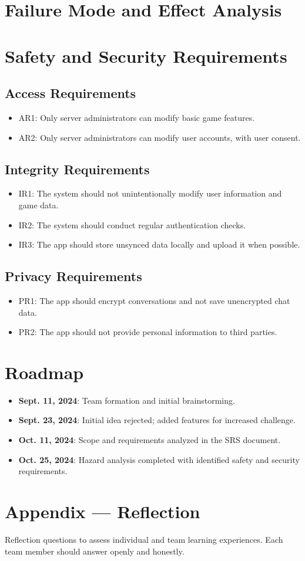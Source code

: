 \documentclass{article}
\begin{document}
\section{Failure Mode and Effect Analysis}

\section{Safety and Security Requirements}
\subsection{Access Requirements}
\begin{itemize}
    \item AR1: Only server administrators can modify basic game features.
    \item AR2: Only server administrators can modify user accounts, with user consent.
\end{itemize}

\subsection{Integrity Requirements}
\begin{itemize}
    \item IR1: The system should not unintentionally modify user information and game data.
    \item IR2: The system should conduct regular authentication checks.
    \item IR3: The app should store unsynced data locally and upload it when possible.
\end{itemize}

\subsection{Privacy Requirements}
\begin{itemize}
    \item PR1: The app should encrypt conversations and not save unencrypted chat data.
    \item PR2: The app should not provide personal information to third parties.
\end{itemize}

\section{Roadmap}
\begin{itemize}
    \item \textbf{Sept. 11, 2024}: Team formation and initial brainstorming.
    \item \textbf{Sept. 23, 2024}: Initial idea rejected; added features for increased challenge.
    \item \textbf{Oct. 11, 2024}: Scope and requirements analyzed in the SRS document.
    \item \textbf{Oct. 25, 2024}: Hazard analysis completed with identified safety and security requirements.
\end{itemize}

\section*{Appendix — Reflection}
Reflection questions to assess individual and team learning experiences. Each team member should answer openly and honestly.
\end{document}

